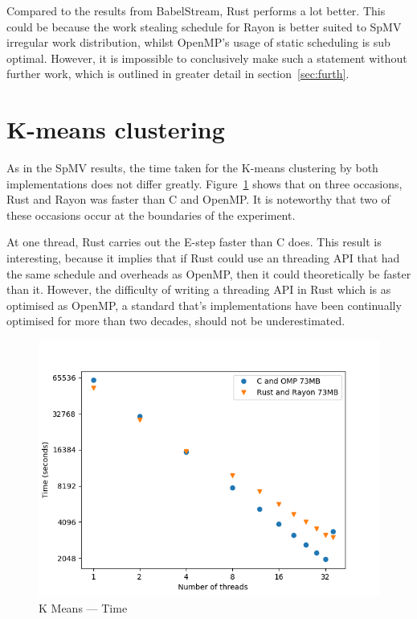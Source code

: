 Compared to the results from BabelStream, Rust performs a lot better. This could be because the work stealing schedule for Rayon is better suited to SpMV irregular work distribution, whilst OpenMP's usage of static scheduling is sub optimal. However, it is impossible to conclusively make such a statement without further work, which is outlined in greater detail in section~\ref{sec:furth}.


\section{K-means clustering}

As in the SpMV results, the time taken for the K-means clustering by both implementations does not differ greatly. Figure~\ref{fig:kmeans-time} shows that on three occasions, Rust and Rayon was faster than C and OpenMP. It is noteworthy that two of these occasions occur at the boundaries of the experiment.

At one thread, Rust carries out the E-step faster than C does. This result is interesting, because it implies that if Rust could use an threading API that had the same schedule and overheads as OpenMP, then it could theoretically be faster than it. However, the difficulty of writing a threading API in Rust which is as optimised as OpenMP, a standard that's implementations have been continually optimised for more than two decades, should not be underestimated.

\begin{figure}[h]
\centering
\includegraphics[width=.9\linewidth]{figs/kmeans/time.png}
\caption{K Means --- Time}\label{fig:kmeans-time}
\end{figure}

